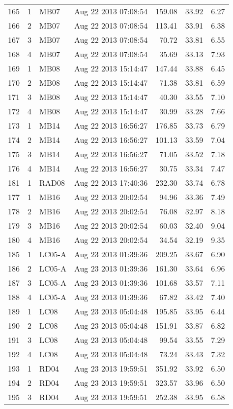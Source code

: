 \begin{longtable}{ccllrrr}
\hline 
165&1&MB07&Aug 22 2013 07:08:54&159.08&33.92&6.27\\
166&2&MB07&Aug 22 2013 07:08:54&113.41&33.91&6.38\\
167&3&MB07&Aug 22 2013 07:08:54&70.72&33.81&6.55\\
168&4&MB07&Aug 22 2013 07:08:54&35.69&33.13&7.93\\
\hline 
169&1&MB08&Aug 22 2013 15:14:47&147.44&33.88&6.45\\
170&2&MB08&Aug 22 2013 15:14:47&71.38&33.81&6.59\\
171&3&MB08&Aug 22 2013 15:14:47&40.30&33.55&7.10\\
172&4&MB08&Aug 22 2013 15:14:47&30.99&33.28&7.66\\
\hline 
173&1&MB14&Aug 22 2013 16:56:27&176.85&33.73&6.79\\
174&2&MB14&Aug 22 2013 16:56:27&101.13&33.59&7.04\\
175&3&MB14&Aug 22 2013 16:56:27&71.05&33.52&7.18\\
176&4&MB14&Aug 22 2013 16:56:27&30.75&33.34&7.47\\
\hline 
181&1&RAD08&Aug 22 2013 17:40:36&232.30&33.74&6.78\\
\hline 
177&1&MB16&Aug 22 2013 20:02:54&94.96&33.36&7.49\\
178&2&MB16&Aug 22 2013 20:02:54&76.08&32.97&8.18\\
179&3&MB16&Aug 22 2013 20:02:54&60.03&32.40&9.04\\
180&4&MB16&Aug 22 2013 20:02:54&34.54&32.19&9.35\\
\hline 
185&1&LC05-A&Aug 23 2013 01:39:36&209.25&33.67&6.90\\
186&2&LC05-A&Aug 23 2013 01:39:36&161.30&33.64&6.96\\
187&3&LC05-A&Aug 23 2013 01:39:36&101.68&33.57&7.11\\
188&4&LC05-A&Aug 23 2013 01:39:36&67.82&33.42&7.40\\
\hline 
189&1&LC08&Aug 23 2013 05:04:48&195.85&33.95&6.44\\
190&2&LC08&Aug 23 2013 05:04:48&151.91&33.87&6.82\\
191&3&LC08&Aug 23 2013 05:04:48&99.54&33.55&7.29\\
192&4&LC08&Aug 23 2013 05:04:48&73.24&33.43&7.32\\
\hline 
193&1&RD04&Aug 23 2013 19:59:51&351.92&33.92&6.50\\
194&2&RD04&Aug 23 2013 19:59:51&323.57&33.96&6.50\\
195&3&RD04&Aug 23 2013 19:59:51&252.38&33.95&6.58\\

\end{longtable}
